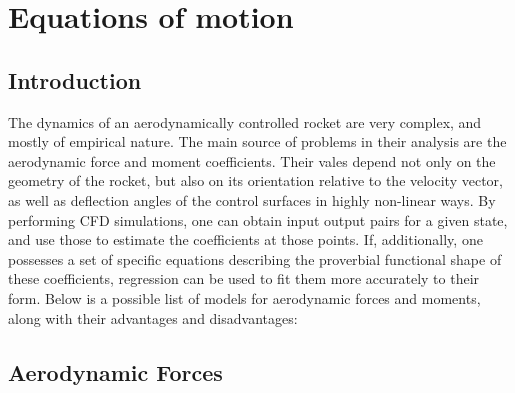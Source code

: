 \chapter{Equations of motion}
\section{Introduction}
The dynamics of an aerodynamically controlled rocket are very complex, and mostly of empirical nature.
The main source of problems in their analysis are the aerodynamic force and moment coefficients. Their
vales depend not only on the geometry of the rocket, but also on its orientation relative to the velocity
vector, as well as deflection angles of the control surfaces in highly non-linear ways. By performing
CFD simulations, one can obtain input output pairs for a given state, and use those to estimate the coefficients
at those points. If, additionally, one possesses a set of specific equations describing the proverbial functional shape of these coefficients, regression can be used to fit them more accurately to their form.
Below is a possible list of models for aerodynamic forces and moments, along with their advantages and disadvantages:
\section{Aerodynamic Forces}
